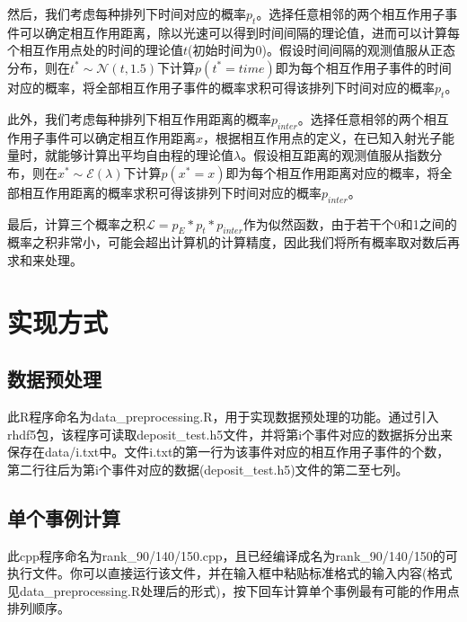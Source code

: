 \documentclass[12pt,a4paper]{article}%
\begin{document}
    然后，我们考虑每种排列下时间对应的概率$p_t$。选择任意相邻的两个相互作用子事件可以确定相互作用距离，除以光速可以得到时间间隔的理论值，进而可以计算每个相互作用点处的时间的理论值$t$(初始时间为0)。假设时间间隔的观测值服从正态分布，则在$t^*\sim \mathcal N(t, 1.5)$下计算$p(t^*=time)$即为每个相互作用子事件的时间对应的概率，将全部相互作用子事件的概率求积可得该排列下时间对应的概率$p_t$。
    
    此外，我们考虑每种排列下相互作用距离的概率$p_{inter}$。选择任意相邻的两个相互作用子事件可以确定相互作用距离$x$，根据相互作用点的定义，在已知入射光子能量时，就能够计算出平均自由程的理论值$\lambda$。假设相互距离的观测值服从指数分布，则在$x^*\sim \mathcal E(\lambda)$下计算$p(x^*=x)$即为每个相互作用距离对应的概率，将全部相互作用距离的概率求积可得该排列下时间对应的概率$p_{inter}$。

    最后，计算三个概率之积$\mathcal L=p_E*p_t*p_{inter}$作为似然函数，由于若干个0和1之间的概率之积非常小，可能会超出计算机的计算精度，因此我们将所有概率取对数后再求和来处理。
    \newpage
\section{实现方式}
    \subsection{数据预处理}
    此R程序命名为data\_preprocessing.R，用于实现数据预处理的功能。通过引入rhdf5包，该程序可读取deposit\_test.h5文件，并将第i个事件对应的数据拆分出来保存在data/i.txt中。文件i.txt的第一行为该事件对应的相互作用子事件的个数，第二行往后为第i个事件对应的数据(deposit\_test.h5)文件的第二至七列。
    
    \subsection{单个事例计算}
    此cpp程序命名为rank\_90/140/150.cpp，且已经编译成名为rank\_90/140/150的可执行文件。你可以直接运行该文件，并在输入框中粘贴标准格式的输入内容(格式见data\_preprocessing.R处理后的形式)，按下回车计算单个事例最有可能的作用点排列顺序。\par
 
\end{document}
